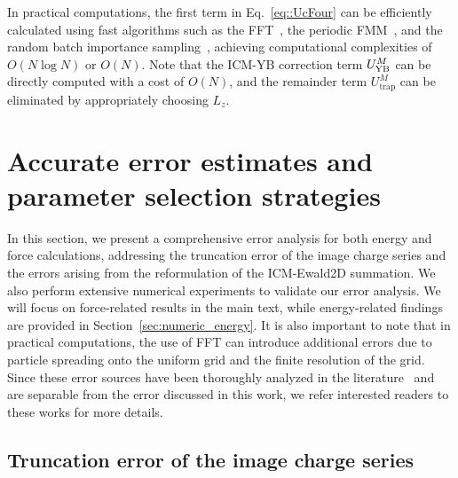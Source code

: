 In practical computations, the first term in Eq.~\eqref{eq::UcFour} can be efficiently calculated using fast algorithms such as the FFT~\cite{yuan2021particle}, the periodic FMM~\cite{pei2023fast}, and the random batch importance sampling~\cite{liang2022improved}, achieving computational complexities of $O(N\log N)$ or $O(N)$. 
Note that the ICM-YB correction term $U_{\text{YB}}^{M}$ can be directly computed with a cost of $O(N)$, and the remainder term $U_{\text{trap}}^M$ can be eliminated by appropriately choosing $L_z$.

\section{Accurate error estimates and parameter selection strategies}

In this section, we present a comprehensive error analysis for both energy and force calculations, addressing the truncation error of the image charge series and the errors arising from the reformulation of the ICM-Ewald2D summation. 
We also perform extensive numerical experiments to validate our error analysis.
We will focus on force-related results in the main text, while energy-related findings are provided in Section~\ref{sec:numeric_energy}.
It is also important to note that in practical computations, the use of FFT can introduce additional errors due to particle spreading onto the uniform grid and the finite resolution of the grid. 
Since these error sources have been thoroughly analyzed in the literature~\cite{deserno1998mesh,wang2012numerical,liang2023error,wang2016multiple,barnett2019parallel,barnett2021aliasing} and are separable from the error discussed in this work, we refer interested readers to these works for more details.

\subsection{Truncation error of the image charge series}\label{sec:error_image}

